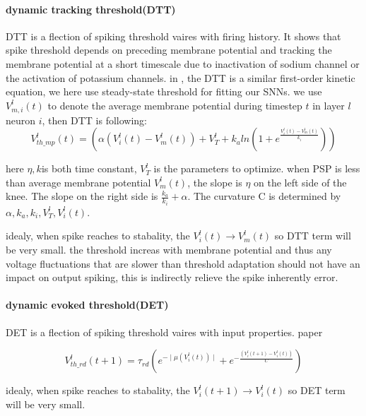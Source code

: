 \documentclass{article}
\begin{document}
\paragraph{dynamic tracking threshold(DTT)} DTT is a flection of spiking threshold vaires with firing history. It shows that spike threshold depends on preceding membrane potential
and tracking the membrane potential at a short timescale due to inactivation of sodium channel\cite{kuba2010presynaptic, hu2009distinct, platkiewicz2011impact} or the activation of potassium channels\cite{higgs2011kv1, goldberg2008k}.
in \cite{fontaine2014spike}, the DTT is a similar first-order kinetic equation, we here use steady-state threshold for fitting our SNNs.
we use $V_{m,i}^l(t)$ to denote the average membrane potential during timestep $t$ in layer $l$ neuron $i$, then DTT is following:
\begin{equation}
  V_{th\_mp}^l(t) = \left(\alpha\left(V_i^l(t)-V_m^l(t)\right)+V_{T}^l+k_aln\left(1+e^{\frac{V_i^l(t)-V_m^l(t)}{k_i}}\right)\right)
\end{equation}

here $\eta, k$is both time constant, $V_{T}^l$ is the parameters to optimize. when PSP is less than average membrane potential $V_m^l(t)$, the slope is $\eta$ on the left side of the knee. The slope on the right side is $\frac{k_a}{k_i} + \alpha$. The curvature C is determined by $\alpha, k_a, k_i, V_{T}^l, V_i^l(t)$.

idealy, when spike reaches to stabality, the $V_i^l(t) \to V_m^l(t)$ so DTT term will be very small.
the threshold increas with membrane potential and thus any voltage fluctuations that are slower than threshold adaptation should not have an impact on output spiking, this is indirectly relieve the spike inherently error.

\paragraph{dynamic evoked threshold(DET)} DET is a flection of spiking threshold vaires with input properties. paper

\begin{equation}
  V_{th\_rd}^l(t+1) = \tau_{rd}\left(e^{-\mid\mu\left(V_i^l(t)\right)\mid} + e^{-\frac{\left(V_i^l(t+1)-V_i^l(t)\right)}{C}}\right)
\end{equation}

idealy, when spike reaches to stabality, the $V_i^l(t+1) \to V_i^l(t)$ so DET term will be very small.
\end{document}
